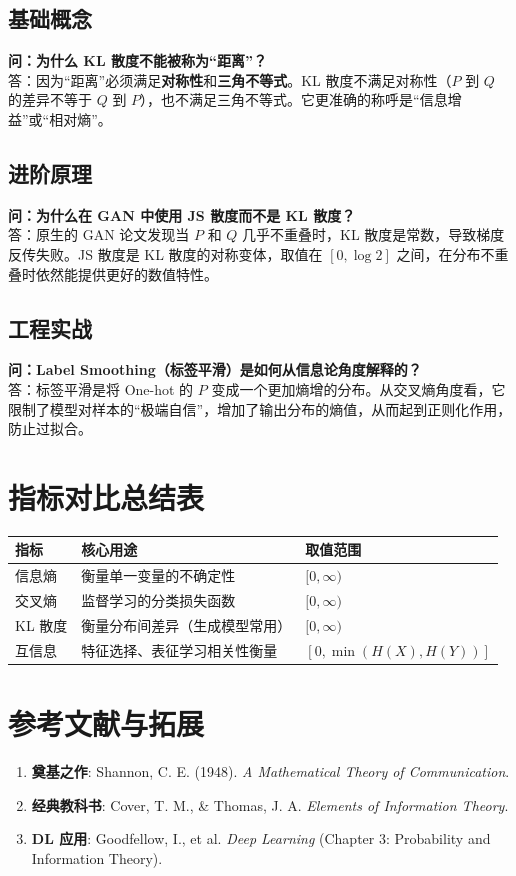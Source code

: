 \documentclass[12pt, a4paper]{book}
\begin{document}
\subsection{基础概念}
\textbf{问：为什么 KL 散度不能被称为“距离”？}\\
答：因为“距离”必须满足\textbf{对称性}和\textbf{三角不等式}。KL 散度不满足对称性（$P$ 到 $Q$ 的差异不等于 $Q$ 到 $P$），也不满足三角不等式。它更准确的称呼是“信息增益”或“相对熵”。

\subsection{进阶原理}
\textbf{问：为什么在 GAN 中使用 JS 散度而不是 KL 散度？}\\
答：原生的 GAN 论文发现当 $P$ 和 $Q$ 几乎不重叠时，KL 散度是常数，导致梯度反传失败。JS 散度是 KL 散度的对称变体，取值在 $[0, \log 2]$ 之间，在分布不重叠时依然能提供更好的数值特性。

\subsection{工程实战}
\textbf{问：Label Smoothing（标签平滑）是如何从信息论角度解释的？}\\
答：标签平滑是将 One-hot 的 $P$ 变成一个更加熵增的分布。从交叉熵角度看，它限制了模型对样本的“极端自信”，增加了输出分布的熵值，从而起到正则化作用，防止过拟合。

\section{指标对比总结表}

\begin{table}[h]
\centering
\begin{tabularx}{\textwidth}{|l|X|l|}
\hline
\textbf{指标} & \textbf{核心用途} & \textbf{取值范围} \\
\hline
信息熵 & 衡量单一变量的不确定性 & $[0, \infty)$ \\
\hline
交叉熵 & 监督学习的分类损失函数 & $[0, \infty)$ \\
\hline
KL 散度 & 衡量分布间差异（生成模型常用） & $[0, \infty)$ \\
\hline
互信息 & 特征选择、表征学习相关性衡量 & $[0, \min(H(X),H(Y))]$ \\
\hline
\end{tabularx}
\end{table}

\section{参考文献与拓展}
\begin{enumerate}
    \item \textbf{奠基之作}: Shannon, C. E. (1948). \textit{A Mathematical Theory of Communication}.
    \item \textbf{经典教科书}: Cover, T. M., & Thomas, J. A. \textit{Elements of Information Theory}.
    \item \textbf{DL 应用}: Goodfellow, I., et al. \textit{Deep Learning} (Chapter 3: Probability and Information Theory).
\end{enumerate}
\end{document}
